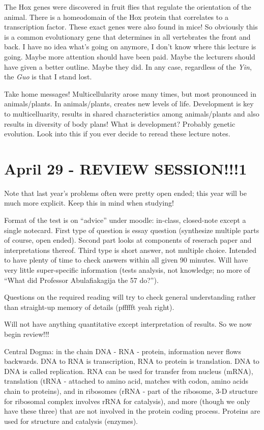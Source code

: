 \documentclass[12pt]{article}
\begin{document}
The Hox genes were discovered in fruit flies that regulate the orientation of the animal. There is a homeodomain of the Hox protein that correlates to a transcription factor. These exact genes were also found in mice! So obviously this is a common evolutionary gene that determines in all vertebrates the front and back. I have no idea what's going on anymore, I don't know where this lecture is going. Maybe more attention should have been paid. Maybe the lecturers should have given a better outline. Maybe they did. In any case, regardless of the \emph{Yin}, the \emph{Guo} is that I stand lost. 

Take home messages! Multicellularity arose many times, but most pronounced in animals/plants. In animals/plants, creates new levels of life. Development is key to multicelluarity, results in shared characteristics among animals/plants and also results in diversity of body plans! What is development? Probably genetic evolution. Look into this if you ever decide to reread these lecture notes.

\section*{April 29 - REVIEW SESSION!!!1}

Note that last year's problems often were pretty open ended; this year will be much more explicit. Keep this in mind when studying!

Format of the test is on ``advice'' under moodle: in-class, closed-note except a single notecard. First type of question is essay question (synthesize multiple parts of course, open ended). Second part looks at components of reserach paper and interpretations thereof. Third type is short answer, not multiple choice. Intended to have plenty of time to check answers within all given 90 minutes. Will have very little super-specific information (tests analysis, not knowledge; no more of ``What did Professor Abulafiakagija the 57 do?''). 

Questions on the required reading will try to check general understanding rather than straight-up memory of details (pffffft yeah right). 

Will not have anything quantitative except interpretation of results. So we now begin review!!!

Central Dogma: in the chain DNA - RNA - protein, information never flows backwards. DNA to RNA is transcription, RNA to protein is translation. DNA to DNA is called replication. RNA can be used for transfer from nucleus (mRNA), translation (tRNA - attached to amino acid, matches with codon, amino acids chain to proteins), and in ribosomes (rRNA - part of the ribosome, 3-D structure for ribosomal complex involves rRNA for catalysis), and more (though we only have these three) that are not involved in the protein coding process. Proteins are used for structure and catalysis (enzymes).
\end{document}
